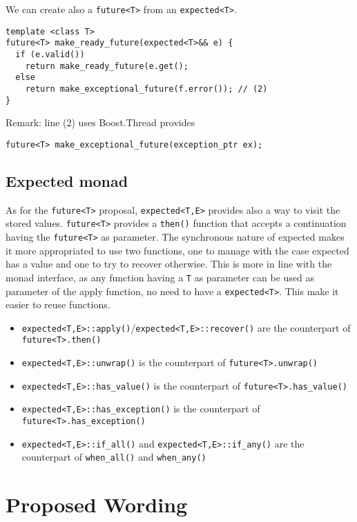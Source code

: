 \documentclass[a4paper,10pt]{article}
\newcommand{\cpp}[1]{\lstinline{#1}}
\begin{document}
We can create also a \cpp{future<T>} from an \cpp{expected<T>}.

\begin{lstlisting}
template <class T>
future<T> make_ready_future(expected<T>&& e) {
  if (e.valid()) 
    return make_ready_future(e.get();
  else 
    return make_exceptional_future(f.error()); // (2)
}
\end{lstlisting}

Remark: line (2) uses Boost.Thread provides

\begin{lstlisting}
future<T> make_exceptional_future(exception_ptr ex);
\end{lstlisting}


\subsection{Expected monad}

As for the \cpp{future<T>} proposal, \cpp{expected<T,E>} provides also a way to visit the stored values.
\cpp{future<T>} provides a \cpp{then()} function that accepts a continuation having the \cpp{future<T>} as parameter. The synchronous nature of expected makes it more appropriated to use two functions, one to manage with the case expected has a value and one to try to recover otherwise. This is more in line with the monad interface, as any function having a \cpp{T} as parameter can be used as parameter of the apply function, no need to have a \cpp{expected<T>}. This make it easier to reuse functions. 

\begin{itemize}
 \item \cpp{expected<T,E>::apply()}/\cpp{expected<T,E>::recover()} are the counterpart of \cpp{future<T>.then()}
 \item \cpp{expected<T,E>::unwrap()} is the counterpart of \cpp{future<T>.unwrap()}
 \item \cpp{expected<T,E>::has_value()} is the counterpart of \cpp{future<T>.has_value()}
 \item \cpp{expected<T,E>::has_exception()} is the counterpart of \cpp{future<T>.has_exception()}
 \item \cpp{expected<T,E>::if_all()} and \cpp{expected<T,E>::if_any()} are the counterpart of \cpp{when_all()} and \cpp{when_any()}
\end{itemize}

\section{Proposed Wording}
\end{document}

